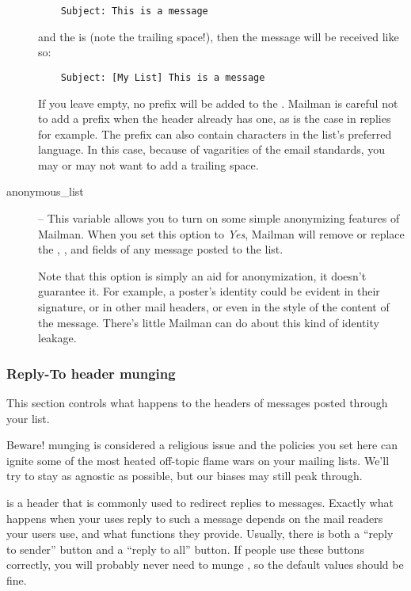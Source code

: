 \documentclass{howto}
\begin{document}
\begin{description}
    \begin{verbatim}
    Subject: This is a message
    \end{verbatim}

    and the  is \code{[My List] } (note the
    trailing space!), then the message will be received like so:

    \begin{verbatim}
    Subject: [My List] This is a message
    \end{verbatim}

    If you leave  empty, no prefix will be added
    to the .  Mailman is careful not to add a
    prefix when the header already has one, as is the case in replies
    for example.  The prefix can also contain characters in the list's
    preferred language.  In this case, because of vagarities of the
    email standards, you may or may not want to add a trailing space.

\item[anonymous_list] --
    This variable allows you to turn on some simple anonymizing
    features of Mailman.  When you set this option to \emph{Yes},
    Mailman will remove or replace the ,
    , and  fields of any
    message posted to the list.

    Note that this option is simply an aid for anonymization, it
    doesn't guarantee it.  For example, a poster's identity could be
    evident in their signature, or in other mail headers, or even in
    the style of the content of the message.  There's little Mailman
    can do about this kind of identity leakage.
\end{description}

\subsubsection{Reply-To header munging}

This section controls what happens to the 
headers of messages posted through your list.

Beware!   munging is considered a religious issue
and the policies you set here can ignite some of the most heated
off-topic flame wars on your mailing lists.  We'll try to stay as
agnostic as possible, but our biases may still peak through.

 is a header that is commonly used to redirect
replies to messages.  Exactly what happens when your uses reply to
such a message depends on the mail readers your users use, and what
functions they provide.  Usually, there is both a ``reply to sender''
button and a ``reply to all'' button.  If people use these buttons
correctly, you will probably never need to munge
, so the default values should be fine.
\end{document}
